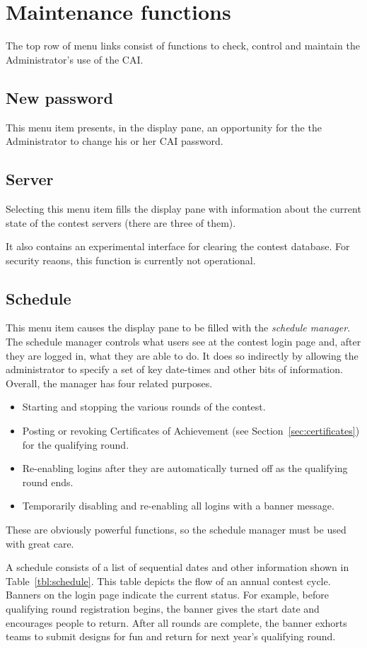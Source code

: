 \documentclass[11pt,letterpaper]{refart}
\begin{document}
\section{Maintenance functions}
The top row of menu links consist of functions to check, control and
maintain the Administrator's use of the CAI.

\subsection{New password}
This menu item presents, in the display pane, an opportunity for the
the Administrator to change his or her CAI password.

\subsection{Server}
Selecting this menu item fills the display pane with information about
the current state of the contest servers (there are three of them).

It also contains an experimental interface for clearing the contest
database.  For security reaons, this function is currently not
operational.

\subsection{Schedule}
This menu item causes the display pane to be filled with the
\emph{schedule manager}. The schedule manager controls what users see
at the contest login page and, after they are logged in, what they are
able to do.  It does so indirectly by allowing the administrator to
specify a set of key date-times and other bits of information.
Overall, the manager has four related purposes.
\begin{itemize}
\item Starting and stopping the various rounds of the contest.
\item Posting or revoking Certificates of Achievement (see Section~\ref{sec:certificates}) 
  for the qualifying round.
\item Re-enabling logins after they are automatically turned off
as the qualifying round ends.
\item Temporarily disabling and re-enabling all logins with a banner 
message.
\end{itemize}
These are obviously powerful functions, so the schedule manager must
be used with great care.

A schedule consists of a list of sequential dates and other
information shown in Table~\ref{tbl:schedule}. This table depicts the
flow of an annual contest cycle. Banners on the login page indicate
the current status. For example, before qualifying round registration
begins, the banner gives the start date and encourages people to
return. After all rounds are complete, the banner exhorts teams to
submit designs for fun and return for next year's qualifying round.
\end{document}
